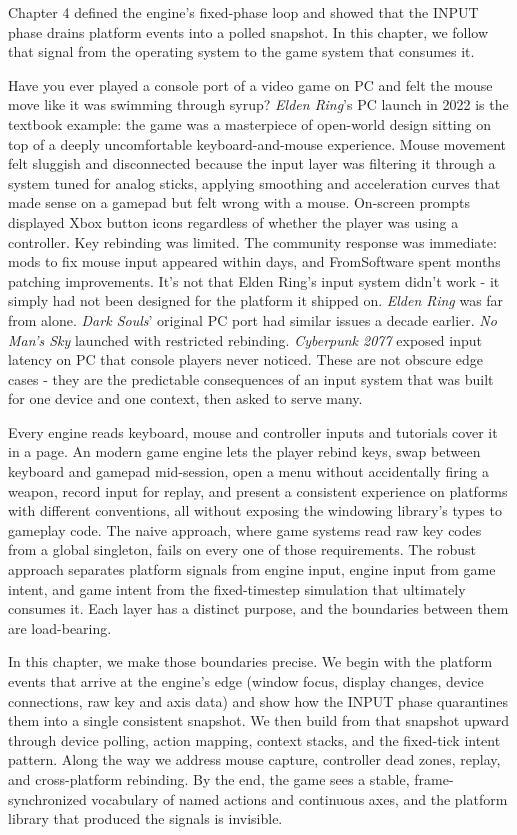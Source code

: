 \documentclass[
  11pt,
  letterpaper,
  DIV=11,
  numbers=noendperiod,
  twoside,
  open=right]{scrreprt}
\begin{document}
Chapter 4 defined the engine's fixed-phase loop and showed that the
INPUT phase drains platform events into a polled snapshot. In this
chapter, we follow that signal from the operating system to the game
system that consumes it.

Have you ever played a console port of a video game on PC and felt the
mouse move like it was swimming through syrup? \emph{Elden Ring}'s PC
launch in 2022 is the textbook example: the game was a masterpiece of
open-world design sitting on top of a deeply uncomfortable
keyboard-and-mouse experience. Mouse movement felt sluggish and
disconnected because the input layer was filtering it through a system
tuned for analog sticks, applying smoothing and acceleration curves that
made sense on a gamepad but felt wrong with a mouse. On-screen prompts
displayed Xbox button icons regardless of whether the player was using a
controller. Key rebinding was limited. The community response was
immediate: mods to fix mouse input appeared within days, and
FromSoftware spent months patching improvements. It's not that Elden
Ring's input system didn't work - it simply had not been designed for
the platform it shipped on. \emph{Elden Ring} was far from alone.
\emph{Dark Souls}' original PC port had similar issues a decade earlier.
\emph{No Man's Sky} launched with restricted rebinding. \emph{Cyberpunk
2077} exposed input latency on PC that console players never noticed.
These are not obscure edge cases - they are the predictable consequences
of an input system that was built for one device and one context, then
asked to serve many.

Every engine reads keyboard, mouse and controller inputs and tutorials
cover it in a page. An modern game engine lets the player rebind keys,
swap between keyboard and gamepad mid-session, open a menu without
accidentally firing a weapon, record input for replay, and present a
consistent experience on platforms with different conventions, all
without exposing the windowing library's types to gameplay code. The
naive approach, where game systems read raw key codes from a global
singleton, fails on every one of those requirements. The robust approach
separates platform signals from engine input, engine input from game
intent, and game intent from the fixed-timestep simulation that
ultimately consumes it. Each layer has a distinct purpose, and the
boundaries between them are load-bearing.

In this chapter, we make those boundaries precise. We begin with the
platform events that arrive at the engine's edge (window focus, display
changes, device connections, raw key and axis data) and show how the
INPUT phase quarantines them into a single consistent snapshot. We then
build from that snapshot upward through device polling, action mapping,
context stacks, and the fixed-tick intent pattern. Along the way we
address mouse capture, controller dead zones, replay, and cross-platform
rebinding. By the end, the game sees a stable, frame-synchronized
vocabulary of named actions and continuous axes, and the platform
library that produced the signals is invisible.
\end{document}
